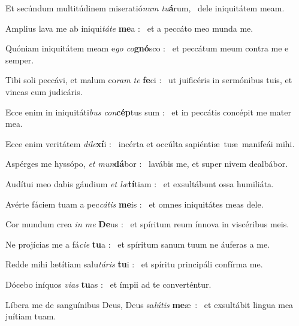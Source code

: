 \documentclass[12pt]{article} %
\newenvironment{psalmtext}{\leftskip 0.25in}{\vspace{1 mm}}
\let\oldgresixstar\gresixstar
\renewcommand{\gresixstar}{\textcolor{benred8}{\oldgresixstar}}
\begin{document}
\begin{psalmtext}

Et sec\'{u}ndum multit\'{u}dinem miserati\'{o}\emph{num tu}\textbf{\'{a}}rum, \gresixstar\ dele iniquit\'{a}tem meam.

Amplius lava me ab iniqui\emph{t\'{a}te} \textbf{me}a : \gresixstar\ et a pecc\'{a}to meo munda me.

Qu\'{o}niam iniquit\'{a}tem meam e\emph{go co}\textbf{gn\'{o}}sco : \gresixstar\ et pecc\'{a}tum meum contra me e semper.

Tibi soli pecc\'{a}vi, et malum co\emph{ram te} \textbf{fe}ci : \gresixstar\ ut juific\'{e}ris in serm\'{o}nibus tuis, et vincas cum judic\'{a}ris.

Ecce enim in iniquit\'{a}ti\emph{bus con}\textbf{c\'{e}p}tus sum : \gresixstar\ et in pecc\'{a}tis conc\'{e}pit me mater mea.

Ecce enim verit\'{a}tem \emph{dile}\textbf{x\'{i}}i : \gresixstar\ inc\'{e}rta et occ\'{u}lta sapi\'{e}nti\ae\  tu\ae\ manife\'{a}i mihi.

Asp\'{e}rges me hyss\'{o}po, \emph{et mun}\textbf{d\'{a}}bor : \gresixstar\ lav\'{a}bis me, et super nivem dealb\'{a}bor.

Aud\'{i}tui meo dabis g\'{a}udium \emph{et l\ae}\textbf{t\'{i}}tiam : \gresixstar\ et exsult\'{a}bunt ossa humili\'{a}ta.

Av\'{e}rte f\'{a}ciem tuam a pec\emph{c\'{a}tis} \textbf{me}is : \gresixstar\ et omnes iniquit\'{a}tes meas dele.

Cor mundum crea \emph{in me} \textbf{De}us : \gresixstar\ et sp\'{i}ritum reum \'{i}nnova in visc\'{e}ribus meis.

Ne proj\'{i}cias me a f\'{a}\emph{cie} \textbf{tu}a : \gresixstar\ et sp\'{i}ritum sanum tuum ne \'{a}uferas a me.

Redde mihi l\ae t\'{i}tiam salu\emph{t\'{a}ris} \textbf{tu}i : \gresixstar\ et sp\'{i}ritu princip\'{a}li conf\'{i}rma me.

D\'{o}cebo in\'{i}quos \emph{vias} \textbf{tu}as : \gresixstar\ et \'{i}mpii ad te convert\'{e}ntur.

L\'{i}bera me de sangu\'{i}nibus Deus, Deus sa\emph{l\'{u}tis} \textbf{me}\ae\ : \gresixstar\ et exsult\'{a}bit lingua mea ju\'{i}tiam tuam.


\end{psalmtext}
\end{document}
